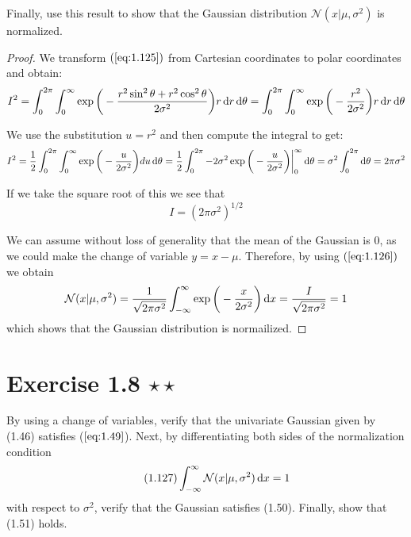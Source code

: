 Finally, use this result to show that the Gaussian distribution $\mathcal{N}(x | \mu, \sigma^2)$ is 
normalized.

\vspace{1em}

\begin{proof}
    We transform $(\ref{eq:1.125})$ from Cartesian coordinates to polar coordinates and obtain:
\[
    I^2 = \int_{0}^{2\pi} \int_0^\infty \exp 
        \bigg(-\frac{r^2\sin^2 \theta + r^2\cos^2 \theta}{2\sigma^2}\bigg) r\mathop{}\!\mathrm{d} r\mathop{}\!\mathrm{d} \theta
        = \int_{0}^{2\pi} \int_{0}^{\infty} \exp \bigg(-\frac{r^2}{2\sigma^2}\bigg) r\mathop{}\!\mathrm{d} r\mathop{}\!\mathrm{d} \theta
    \] 

    We use the substitution $u = r^2$ and then compute the integral to get:
    \[
        I^2 = \frac{1}{2} \int_{0}^{2\pi} \int_{0}^{\infty} \exp\bigg(-\frac{u}{2\sigma^2}\bigg) du\mathop{}\!\mathrm{d} \theta
        = \frac{1}{2} \int_0^{2\pi} -2\sigma^2 \exp\bigg(-\frac{u}{2\sigma^2}\bigg)\bigg|_0^\infty \mathop{}\!\mathrm{d} \theta
        = \sigma^2 \int_{0}^{2\pi} \mathop{}\!\mathrm{d} \theta = 2\pi\sigma^2
    \] 

    If we take the square root of this we see that
    \begin{equation}\tag{1.126}
        I = (2\pi\sigma^2)^{1/2}
    \end{equation}

    We can assume without loss of generality that the mean of the Gaussian is 0,
    as we could make the change of variable $y = x - \mu$. Therefore, by using
    $(\ref{eq:1.126})$ we obtain
    \[
        \mathcal{N}(x | \mu, \sigma^2) 
        = \frac{1}{\sqrt{2\pi\sigma^2}} \int_{-\infty}^{\infty} \exp\bigg(-\frac{x}{2\sigma^2}\bigg) \mathop{}\!\mathrm{d} x
        = \frac{I}{\sqrt{2\pi\sigma^2}} = 1
    \] 
    which shows that the Gaussian distribution is normailized.
\end{proof}

\section*{Exercise 1.8 $\star \star$}
By using a change of variables, verify that the univariate Gaussian
given by (1.46) satisfies ($\ref{eq:1.49}$). Next, by differentiating both sides
of the normalization condition
\begin{equation*}\label{eq:1.127}\tag{1.127}
    \int_{-\infty}^{\infty} \mathcal{N} (x | \mu, \sigma^2) \mathop{}\!\mathrm{d} x = 1
\end{equation*}
with respect to $\sigma^2$, verify that the Gaussian satisfies (1.50). Finally,
show that (1.51) holds.

